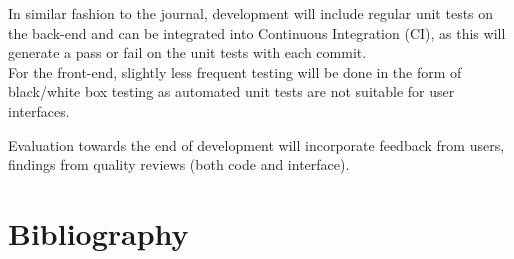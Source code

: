 \documentclass[12pt]{article}
\begin{document}
{In similar fashion to the journal, development will include regular unit tests on the back-end and can be integrated into Continuous Integration (CI), as this will generate a pass or fail on the unit tests with each commit.  \\

For the front-end, slightly less frequent testing will be done in the form of black/white box testing as automated unit tests are not suitable for user interfaces. 

Evaluation towards the end of development will incorporate feedback from users, findings from quality reviews (both code and interface). 

\begin{center}
\end{center}


\newpage
\section*{Bibliography}
}
\end{document}
